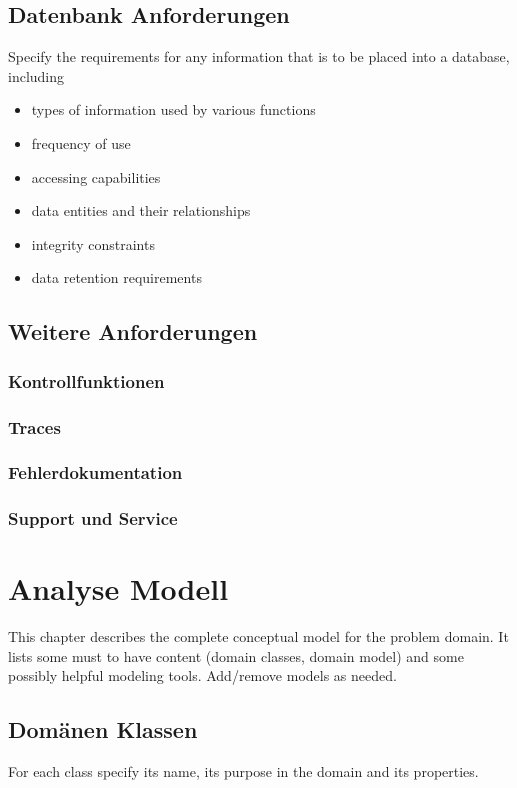 \subsection{Datenbank Anforderungen}
Specify the requirements for any information that is to be placed into a database, including
\begin{itemize}
	\item types of information used by various functions
	\item frequency of use
	\item accessing capabilities
	\item data entities and their relationships
	\item integrity constraints
	\item data retention requirements
\end{itemize}

\subsection{Weitere Anforderungen}

\subsubsection{Kontrollfunktionen}

\subsubsection{Traces}

\subsubsection{Fehlerdokumentation}

\subsubsection{Support und Service}

\newpage

\section{Analyse Modell}
This chapter describes the complete conceptual model for the problem domain. It lists some must to have content (domain classes, domain model) and some possibly helpful modeling tools. Add/remove models as needed.

\subsection{Domänen Klassen}
For each class specify its name, its purpose in the domain and its properties.

